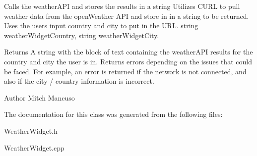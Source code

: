 Calls the weather\+A\+PI and stores the results in a string  Utilizes C\+U\+RL to pull weather data from the open\+Weather A\+PI and store in in a string to be returned. Uses the user\textquotesingle{}s input country and city to put in the U\+RL.  string weather\+Widget\+Country, string weather\+Widget\+City. 

\begin{DoxyReturn}{Returns}
A string with the block of text containing the weather\+A\+PI results for the country and city the user is in. Returns errors depending on the issues that could be faced. For example, an error is returned if the network is not connected, and also if the city / country information is incorrect. 
\end{DoxyReturn}
\begin{DoxyAuthor}{Author}
Mitch Mancuso 
\end{DoxyAuthor}


The documentation for this class was generated from the following files\+:\begin{DoxyCompactItemize}
\item 
Weather\+Widget.\+h\item 
Weather\+Widget.\+cpp\end{DoxyCompactItemize}
